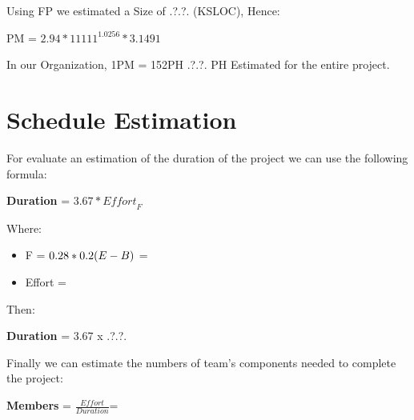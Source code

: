 Using FP we estimated a Size of .?.?. (KSLOC), Hence:
\\\begin{center} PM = $2.94 * 11111^{1.0256} * 3.1491 $ \end{center}
In our Organization, 1PM = 152PH
.?.?. PH Estimated for the entire project.
\section{Schedule Estimation}
For evaluate an estimation of the duration of the project we can use the following formula:
\begin{center}\textbf{Duration} = $3.67 * \textit{Effort}_F$  \end{center}
Where:
\begin{itemize}
\item F = $0.28 * 0.2 \* (E - B)$ =
\item Effort = 
\end{itemize}

Then: \\\begin{center}\textbf{Duration} = 3.67 x .?.?. \end{center}
Finally we can estimate the numbers of team's components needed to complete the project:
\begin{center}\textbf{Members} = $\frac{Effort}{Duration} $= \end{center}

